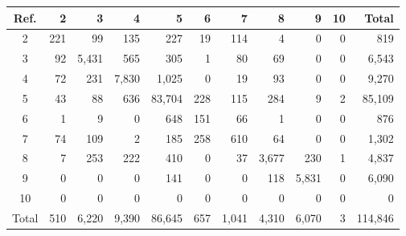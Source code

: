 \begin{tabular}{crrrrrrrrrr}
\toprule
Ref. & 2 & 3 & 4 & 5 & 6 & 7 & 8 & 9 & 10 & Total \\
\midrule
2 & 221 & 99 & 135 & 227 & 19 & 114 & 4 & 0 & 0 & 819 \\
3 & 92 & 5,431 & 565 & 305 & 1 & 80 & 69 & 0 & 0 & 6,543 \\
4 & 72 & 231 & 7,830 & 1,025 & 0 & 19 & 93 & 0 & 0 & 9,270 \\
5 & 43 & 88 & 636 & 83,704 & 228 & 115 & 284 & 9 & 2 & 85,109 \\
6 & 1 & 9 & 0 & 648 & 151 & 66 & 1 & 0 & 0 & 876 \\
7 & 74 & 109 & 2 & 185 & 258 & 610 & 64 & 0 & 0 & 1,302 \\
8 & 7 & 253 & 222 & 410 & 0 & 37 & 3,677 & 230 & 1 & 4,837 \\
9 & 0 & 0 & 0 & 141 & 0 & 0 & 118 & 5,831 & 0 & 6,090 \\
10 & 0 & 0 & 0 & 0 & 0 & 0 & 0 & 0 & 0 & 0 \\
\midrule
Total & 510 & 6,220 & 9,390 & 86,645 & 657 & 1,041 & 4,310 & 6,070 & 3 & 114,846 \\
\bottomrule
\end{tabular}

